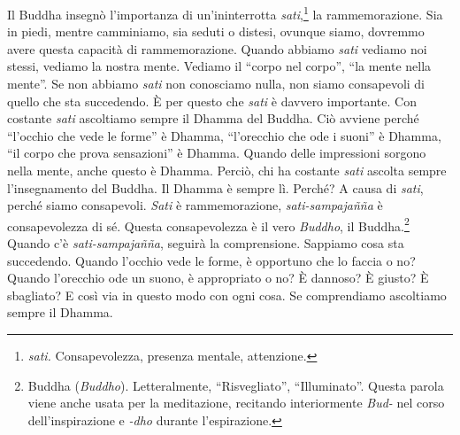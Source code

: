 Il Buddha insegnò l'importanza di un'ininterrotta \emph{sati},\footnote{\emph{sati.}
  Consapevolezza, presenza mentale, attenzione.} la rammemorazione. Sia
in piedi, mentre camminiamo, sia seduti o distesi, ovunque siamo,
dovremmo avere questa capacità di rammemorazione. Quando abbiamo
\emph{sati} vediamo noi stessi, vediamo la nostra mente. Vediamo il
``corpo nel corpo'', ``la mente nella mente''. Se non abbiamo
\emph{sati} non conosciamo nulla, non siamo consapevoli di quello che
sta succedendo. È per questo che \emph{sati} è davvero importante. Con
costante \emph{sati} ascoltiamo sempre il Dhamma del Buddha. Ciò avviene
perché ``l'occhio che vede le forme'' è Dhamma, ``l'orecchio che ode i
suoni'' è Dhamma, ``il corpo che prova sensazioni'' è Dhamma. Quando
delle impressioni sorgono nella mente, anche questo è Dhamma. Perciò,
chi ha costante \emph{sati} ascolta sempre l'insegnamento del Buddha. Il
Dhamma è sempre lì. Perché? A causa di \emph{sati}, perché siamo
consapevoli. \emph{Sati} è rammemorazione, \emph{sati-sampajañña} è
consapevolezza di sé. Questa consapevolezza è il vero \emph{Buddho}, il
Buddha.\footnote{Buddha (\emph{Buddho}). Letteralmente, ``Risvegliato'',
  ``Illuminato''. Questa parola viene anche usata per la meditazione,
  recitando interiormente \emph{Bud-} nel corso dell'inspirazione e
  \emph{-dho} durante l'espirazione.} Quando c'è \emph{sati-sampajañña},
seguirà la comprensione. Sappiamo cosa sta succedendo. Quando l'occhio
vede le forme, è opportuno che lo faccia o no? Quando l'orecchio ode un
suono, è appropriato o no? È dannoso? È giusto? È sbagliato? E così via
in questo modo con ogni cosa. Se comprendiamo ascoltiamo sempre il
Dhamma.

